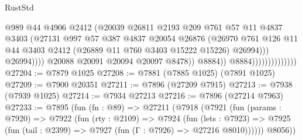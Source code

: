 \begin{lexlean}{RustStd}
\begin{coremodule}
                                                @989
                                                @44
                                                @4906
                                                @2412
                                                (@20039
                                                  @26811
                                                  @2193
                                                  @209
                                                  @761
                                                  @57
                                                  @11
                                                  @4837
                                                  @3403
                                                  (@27131
                                                    @997
                                                    @57
                                                    @387
                                                    @4837
                                                    @20054
                                                    @26876
                                                    (@26970
                                                      @761
                                                      @126
                                                      @11
                                                      @44
                                                      @3403
                                                      @2412
                                                      (@26889 @11 @760 @3403 @15222 @15226)
                                                      @26994)))
                                                @26994))))
                                        @20088
                                        @20091
                                        @20094
                                        @20097
                                        @8478))
                                    @8884))
                                @8884))))))))))))))
@27204 := @7879 @1025
@27208 := @7881 (@7885 @1025) (@7891 @1025)
@27209 := @7900 @20351
@27211 := @7896 (@27209 @7915)
@27213 := @7938 (@7939 @1025)
@27214 := @7934 @27213
@27216 := @7896 (@27214 @7963)
@27233 := @7895
    (fun (fn : @89) =>
    @27211
      (@7918
        (@7921
          (fun (params : @7920) =>
          @7922
            (fun (rty : @2109) =>
            @7924
              (fun (lets : @7923) =>
              @7925 (fun (tail : @2399) => @7927 (fun (Γ : @7926) => @27216 @8010))))))
        @8056))

\end{coremodule}
\end{lexlean}

